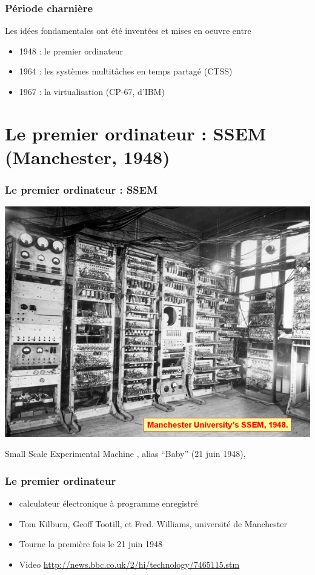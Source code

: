 \documentclass{beamer}
\begin{document}
\begin{frame}
\frametitle{Période charnière}
Les idées fondamentales ont été inventées et mises en oeuvre 
entre
\begin{itemize}
\item \alert{1948} : le premier ordinateur
\item \alert{1964} : les systèmes multitâches en temps partagé (CTSS)
\item \alert{1967} : la virtualisation (CP-67, d'IBM)
\end{itemize}
\end{frame}


\section{Le premier ordinateur : SSEM (Manchester, 1948)}

\begin{frame}
\frametitle{Le premier ordinateur :  SSEM}


\begin{center}
\includegraphics[width=0.75\linewidth]{Historique/1_history-ssem.jpg}
\end{center}

\alert{Small Scale Experimental Machine} , alias ``Baby'' (\alert{21 juin 1948}),

\end{frame}

\begin{frame}
\frametitle{Le premier ordinateur}

\begin{itemize}
\item  calculateur électronique à \alert{programme enregistré}

\item  Tom \alert{Kilburn}, Geoff \alert{Tootill}, et Fred. \alert{Williams}, université de Manchester

\item Tourne la première fois le 21 juin 1948


\item Video
\url{http://news.bbc.co.uk/2/hi/technology/7465115.stm}
\end{itemize}

\end{frame}
\end{document}

